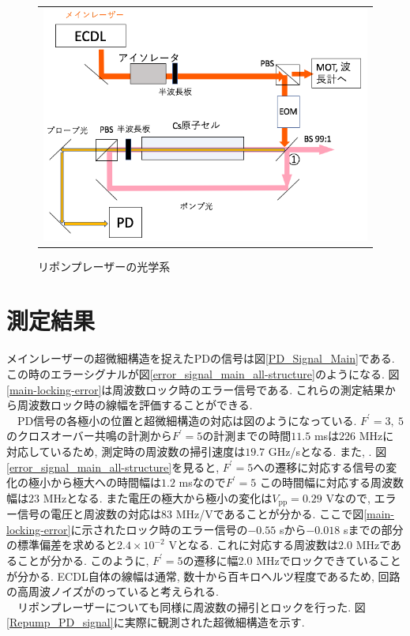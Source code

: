 \documentclass[uplatex, dvipdfmx, a4paper, report, papersize, 11pt]{jsbook}
\begin{document}
\begin{figure}[htpb]
\begin{tabular}{c}
      \begin{minipage}{1\hsize}
        \centering
          \includegraphics[keepaspectratio,  scale=0.35,  angle=0]
                          {figures/saturated-absorption/repump_diagram.png}
                          \caption{リポンプレーザーの光学系}
                          \label{repump_diagram}
      \end{minipage}
    \end{tabular}
\end{figure}

\section{測定結果}

メインレーザーの超微細構造を捉えたPDの信号は図\ref{PD_Signal_Main}である. この時のエラーシグナルが図\ref{error_signal_main_all-structure}のようになる. 図\ref{main-locking-error}は周波数ロック時のエラー信号である. これらの測定結果から周波数ロック時の線幅を評価することができる. \\
　PD信号の各極小の位置と超微細構造の対応は図のようになっている. $F^{\prime} = 3,\ 5$のクロスオーバー共鳴の計測から$F^{\prime} = 5$の計測までの時間$11.5$ msは$226$ MHzに対応しているため, 測定時の周波数の掃引速度は$19.7$ GHz/sとなる. また, . 図\ref{error_signal_main_all-structure}を見ると, $F^{\prime} = 5$への遷移に対応する信号の変化の極小から極大への時間幅は$1.2$ msなので$F^{\prime} = 5$
この時間幅に対応する周波数幅は$23$ MHzとなる. また電圧の極大から極小の変化は$V_{\mathrm{pp}} = 0.29$ Vなので, エラー信号の電圧と周波数の対応は$83$ MHz/Vであることが分かる. ここで図\ref{main-locking-error}に示されたロック時のエラー信号の$-0.55$ sから$-0.018$ sまでの部分の標準偏差を求めると$2.4\times 10^{-2}$ Vとなる. これに対応する周波数は$2.0$ MHzであることが分かる. このように, $F^{\prime} = 5$の遷移に幅$2.0$ MHzでロックできていることが分かる. ECDL自体の線幅は通常, 数十から百キロヘルツ程度であるため, 回路の高周波ノイズがのっていると考えられる. \\
　リポンプレーザーについても同様に周波数の掃引とロックを行った. 図\ref{Repump_PD_signal}に実際に観測された超微細構造を示す.
\end{document}
